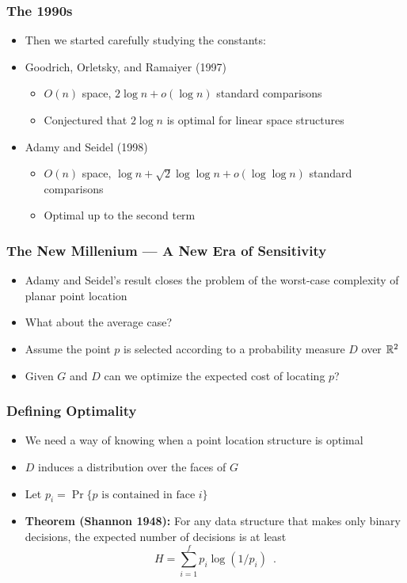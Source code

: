 \documentclass{beamer}
\begin{document}
\frame
{
  \frametitle{The 1990s}
  \begin{itemize}
  \item<1-> Then we started carefully studying the constants:
   \item<2-> Goodrich, Orletsky, and Ramaiyer (1997)
   \begin{itemize}
      \item<3-> $O(n)$ space, $2\log n + o(\log n)$ standard comparisons
      \item<4-> Conjectured that $2\log n$ is optimal for linear space structures
   \end{itemize}
   \item<5-> Adamy and Seidel (1998)
   \begin{itemize}
      \item<6-> $O(n)$ space, $\log n + \sqrt{2}\log\log n +
o(\log\log n)$ standard comparisons
      \item<7-> Optimal up to the second term
   \end{itemize}
  \end{itemize}
}

\frame
{
  \frametitle{The New Millenium --- A New Era of Sensitivity}
  \begin{itemize}
  \item<1-> Adamy and Seidel's result closes the problem of the
	worst-case complexity of planar point location
  \item<2-> What about the average case?
  \item<3-> Assume the point $p$ is selected according to a
	probability measure $D$ over $\mathbb{R}^2$
  \item<4-> Given $G$ and $D$ can we optimize the expected cost of
	locating $p$?
  \end{itemize}
}

\frame
{
  \frametitle{Defining Optimality}
  \begin{itemize}
   \item<1-> We need a way of knowing when a point location structure
	is optimal
   \item<2-> $D$ induces a distribution over the faces of $G$
   \item<3-> Let $p_i=\Pr\{\mbox{$p$ is contained in face $i$}\}$
   \item<4-> \textbf{Theorem (Shannon 1948):}
     For any data structure that makes only binary decisions, the
expected number of decisions is at least
   \[
      H = \sum_{i=1}^f p_i\log(1/p_i)  \enspace .
   \]
  \end{itemize}
}
\end{document}
